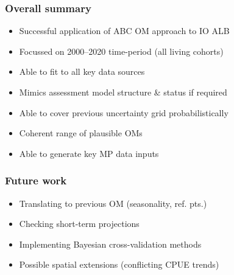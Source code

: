 \documentclass{beamer}
\begin{document}
\begin{frame}
    \frametitle{Overall summary}
\begin{itemize}
    \item Successful application of ABC OM approach to IO ALB 
    \item Focussed on 2000--2020 time-period (all living cohorts)
    \item Able to fit to all key data sources
    \item Mimics assessment model structure \& status if required
    \item Able to cover previous uncertainty grid probabilistically
    \item Coherent range of plausible OMs
    \item Able to generate key MP data inputs
\end{itemize}
\end{frame}
\begin{frame}
    \frametitle{Future work}
\begin{itemize}
    \item Translating to previous OM (seasonality, ref. pts.)
    \item Checking short-term projections
    \item Implementing Bayesian cross-validation methods
    \item Possible spatial extensions (conflicting CPUE trends)
\end{itemize}
\end{frame}
\end{document}
